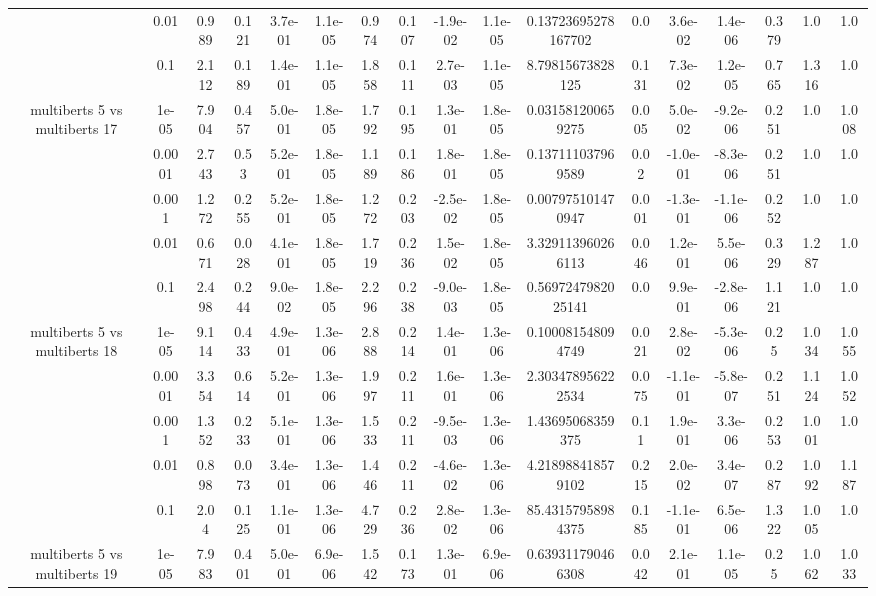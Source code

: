 \begin{tabular}{|c|c|c|c|c|c|c|c|c|c|c|c|c|c|c|c|c|}
 & 0.01 & 0.989 & 0.121 & 3.7e-01 & 1.1e-05 & 0.974 & 0.107 & -1.9e-02 & 1.1e-05 & 0.13723695278167702 & 0.0 & 3.6e-02 & 1.4e-06 & 0.379 & 1.0 & 1.0 \\
 & 0.1 & 2.112 & 0.189 & 1.4e-01 & 1.1e-05 & 1.858 & 0.111 & 2.7e-03 & 1.1e-05 & 8.79815673828125 & 0.131 & 7.3e-02 & 1.2e-05 & 0.765 & 1.316 & 1.0 \\
\hline
\multirow{5}{*}{multiberts 5 vs multiberts 17} & 1e-05 & 7.904 & 0.457 & 5.0e-01 & 1.8e-05 & 1.792 & 0.195 & 1.3e-01 & 1.8e-05 & 0.031581200659275 & 0.005 & 5.0e-02 & -9.2e-06 & 0.251 & 1.0 & 1.008 \\
 & 0.0001 & 2.743 & 0.53 & 5.2e-01 & 1.8e-05 & 1.189 & 0.186 & 1.8e-01 & 1.8e-05 & 0.137111037969589 & 0.02 & -1.0e-01 & -8.3e-06 & 0.251 & 1.0 & 1.0 \\
 & 0.001 & 1.272 & 0.255 & 5.2e-01 & 1.8e-05 & 1.272 & 0.203 & -2.5e-02 & 1.8e-05 & 0.007975101470947 & 0.001 & -1.3e-01 & -1.1e-06 & 0.252 & 1.0 & 1.0 \\
 & 0.01 & 0.671 & 0.028 & 4.1e-01 & 1.8e-05 & 1.719 & 0.236 & 1.5e-02 & 1.8e-05 & 3.329113960266113 & 0.046 & 1.2e-01 & 5.5e-06 & 0.329 & 1.287 & 1.0 \\
 & 0.1 & 2.498 & 0.244 & 9.0e-02 & 1.8e-05 & 2.296 & 0.238 & -9.0e-03 & 1.8e-05 & 0.5697247982025141 & 0.0 & 9.9e-01 & -2.8e-06 & 1.121 & 1.0 & 1.0 \\
\hline
\multirow{5}{*}{multiberts 5 vs multiberts 18} & 1e-05 & 9.114 & 0.433 & 4.9e-01 & 1.3e-06 & 2.888 & 0.214 & 1.4e-01 & 1.3e-06 & 0.100081548094749 & 0.021 & 2.8e-02 & -5.3e-06 & 0.25 & 1.034 & 1.055 \\
 & 0.0001 & 3.354 & 0.614 & 5.2e-01 & 1.3e-06 & 1.997 & 0.211 & 1.6e-01 & 1.3e-06 & 2.303478956222534 & 0.075 & -1.1e-01 & -5.8e-07 & 0.251 & 1.124 & 1.052 \\
 & 0.001 & 1.352 & 0.233 & 5.1e-01 & 1.3e-06 & 1.533 & 0.211 & -9.5e-03 & 1.3e-06 & 1.43695068359375 & 0.11 & 1.9e-01 & 3.3e-06 & 0.253 & 1.001 & 1.0 \\
 & 0.01 & 0.898 & 0.073 & 3.4e-01 & 1.3e-06 & 1.446 & 0.211 & -4.6e-02 & 1.3e-06 & 4.218988418579102 & 0.215 & 2.0e-02 & 3.4e-07 & 0.287 & 1.092 & 1.187 \\
 & 0.1 & 2.04 & 0.125 & 1.1e-01 & 1.3e-06 & 4.729 & 0.236 & 2.8e-02 & 1.3e-06 & 85.43157958984375 & 0.185 & -1.1e-01 & 6.5e-06 & 1.322 & 1.005 & 1.0 \\
\hline
\multirow{5}{*}{multiberts 5 vs multiberts 19} & 1e-05 & 7.983 & 0.401 & 5.0e-01 & 6.9e-06 & 1.542 & 0.173 & 1.3e-01 & 6.9e-06 & 0.639311790466308 & 0.042 & 2.1e-01 & 1.1e-05 & 0.25 & 1.062 & 1.033 \\

\end{tabular}
